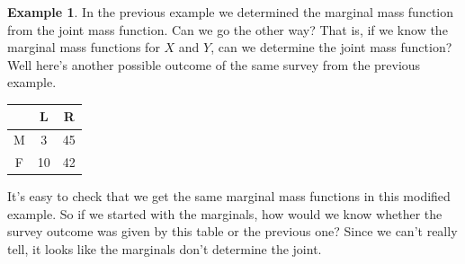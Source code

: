\documentclass[12pt]{article}
\theoremstyle{plain}
\theoremstyle{definition}
\newtheorem{example}[theorem]{Example}
\theoremstyle{remark}
\begin{document}
\begin{example}
    In the previous example we determined the marginal mass function from the joint mass function.
    Can we go the other way?
    That is, if we know the marginal mass functions for $X$ and $Y$, can we determine the joint mass function?
    Well here's another possible outcome of the same survey from the previous example.
    \begin{center}
    \begin{tabular}{|c || c | c|}
        \hline
           & L & R\\
        \hline
         M & 3 & 45\\
         F & 10 & 42\\
         \hline
    \end{tabular}
    \end{center}
    It's easy to check that we get the same marginal mass functions in this modified example.
    So if we started with the marginals, how would we know whether the survey outcome was given by this table or the previous one?
    Since we can't really tell, it looks like the marginals don't determine the joint.


\end{example}
\end{document}
